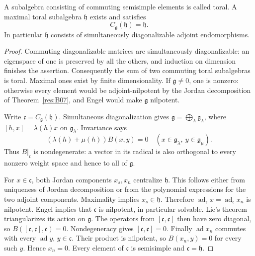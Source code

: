 \begin{proposition}\label{res:D01}
A subalgebra consisting of commuting semisimple elements is called
toral. A maximal toral subalgebra \(\mathfrak h\) exists and satisfies
\[
 C_{\mathfrak g}(\mathfrak h)=\mathfrak h.
\]
In particular \(\mathfrak h\) consists of simultaneously diagonalizable
adjoint endomorphisms.
\end{proposition}
\begin{proof}
Commuting diagonalizable matrices are simultaneously diagonalizable:
an eigenspace of one is preserved by all the others, and induction on
dimension finishes the assertion. Consequently the sum of two commuting
toral subalgebras is toral. Maximal ones exist by finite dimensionality.
If \(\mathfrak g\ne0\), one is nonzero: otherwise every element would
be adjoint-nilpotent by the Jordan decomposition
of Theorem~\ref{res:B07}, and Engel would make \(\mathfrak g\) nilpotent.

Write \(\mathfrak c=C_{\mathfrak g}(\mathfrak h)\). Simultaneous
diagonalization gives
\(\mathfrak g=\bigoplus_\lambda\mathfrak g_\lambda\), where
\([h,x]=\lambda(h)x\) on \(\mathfrak g_\lambda\).
Invariance says
\[
 (\lambda(h)+\mu(h))B(x,y)=0
 \quad(x\in\mathfrak g_\lambda,\ y\in\mathfrak g_\mu).
\]
Thus \(B|_{\mathfrak c}\) is nondegenerate: a vector in its radical
is also orthogonal to every nonzero weight space and hence to all
of \(\mathfrak g\).

For \(x\in\mathfrak c\), both Jordan components \(x_s,x_n\) centralize
\(\mathfrak h\). This follows either from uniqueness of Jordan
decomposition or from the polynomial expressions for the two adjoint
components. Maximality implies \(x_s\in\mathfrak h\).
Therefore \(\operatorname{ad}_{\mathfrak c}x=
\operatorname{ad}_{\mathfrak c}x_n\) is nilpotent.
Engel implies that \(\mathfrak c\) is nilpotent, in particular solvable.
Lie's theorem triangularizes its action on \(\mathfrak g\).
The operators from \([\mathfrak c,\mathfrak c]\) then have zero
diagonal, so
\(B([\mathfrak c,\mathfrak c],\mathfrak c)=0\).
Nondegeneracy gives \([\mathfrak c,\mathfrak c]=0\).
Finally \(\operatorname{ad}x_n\) commutes with every
\(\operatorname{ad}y\), \(y\in\mathfrak c\). Their product is nilpotent,
so \(B(x_n,y)=0\) for every such \(y\). Hence \(x_n=0\).
Every element of \(\mathfrak c\) is semisimple and
\(\mathfrak c=\mathfrak h\).
\end{proof}

